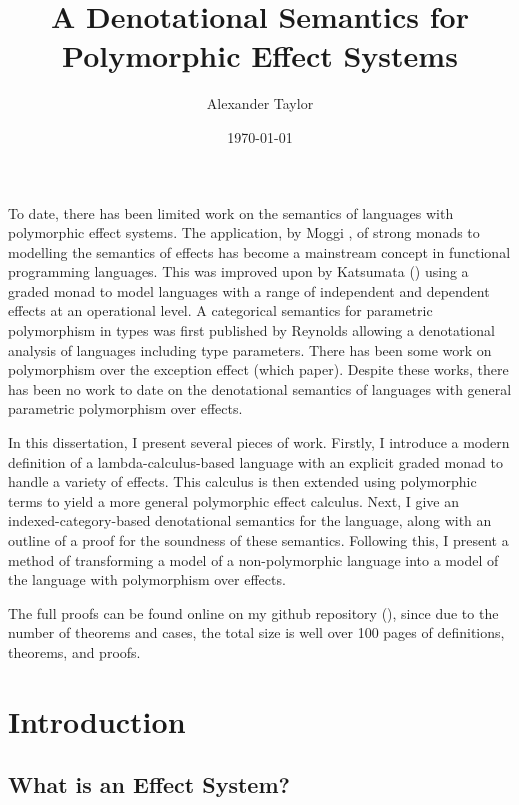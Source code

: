\documentclass{Report}
\title{A Denotational Semantics for Polymorphic Effect Systems}
\date{\today}
\author{Alexander Taylor}
\begin{document}
\maketitle

\abstract
To date, there has been limited work on the semantics of languages with polymorphic effect systems. The application, by Moggi \cite{MoggiMonads}, of strong monads to modelling the semantics of effects has become a mainstream concept in functional programming languages. This was improved upon by Katsumata (\cite{Katsumata:2014}) using a graded monad to model languages with a range of independent and dependent effects at an operational level. A categorical semantics for parametric polymorphism in types was first published by Reynolds \cite{PLCSemantics} allowing a denotational analysis of languages including type parameters. There has been some work on polymorphism over the exception effect (which paper). Despite these works, there has been no work to date on the denotational semantics of languages with general parametric polymorphism over effects.

In this dissertation, I present several pieces of work. Firstly, I introduce a modern definition of a lambda-calculus-based language with an explicit graded monad to handle a variety of effects. This calculus is then extended using polymorphic terms to yield a more general polymorphic effect calculus. Next, I give an indexed-category-based denotational semantics for the language, along with an outline of a proof for the soundness of these semantics. Following this, I present a method of transforming a model of a non-polymorphic language into a model of the language with polymorphism over effects.

The full proofs can be found online on my github repository (), since due to the number of theorems and cases, the total size is well over 100 pages of definitions, theorems, and proofs.

\tableofcontents

\chapter{Introduction}


\section{What is an Effect System?}
\end{document}
